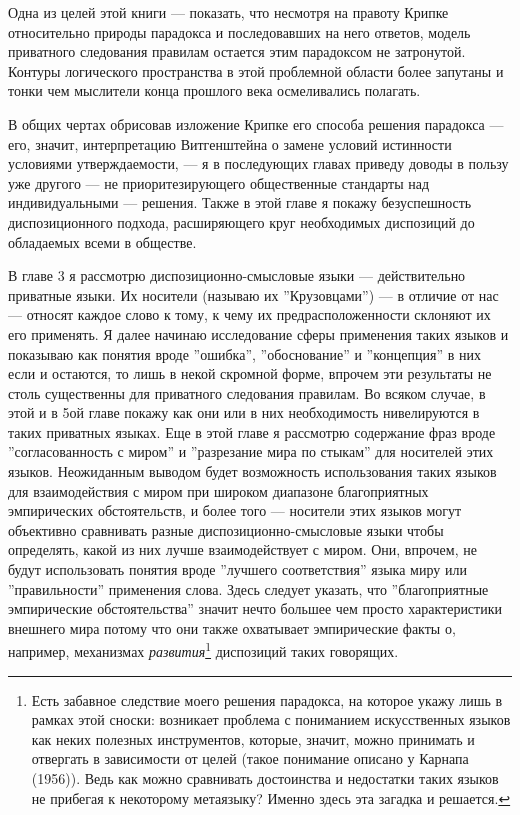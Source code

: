 \documentclass[11pt]{book}
\begin{document}
\smallskip

Одна из целей этой книги --- показать, что несмотря на правоту Крипке относительно природы парадокса и последовавших на него ответов, модель приватного следования правилам остается этим парадоксом не затронутой. Контуры логического пространства в этой проблемной области более запутаны и тонки чем мыслители конца прошлого века осмеливались полагать.

В общих чертах обрисовав изложение Крипке его способа решения парадокса --- его, значит, интерпретацию Витгенштейна о замене условий истинности условиями утверждаемости, --- я в последующих главах приведу доводы в пользу уже другого --- не приоритезирующего общественные стандарты над индивидуальными --- решения. Также в этой главе я покажу безуспешность диспозиционного подхода, расширяющего круг необходимых диспозиций до обладаемых всеми в обществе.

В главе 3 я рассмотрю диспозиционно-смысловые языки --- действительно приватные языки. Их носители (называю их ''Крузовцами'') --- в отличие от нас --- относят каждое слово к тому, к чему их предрасположенности склоняют их его применять. Я далее начинаю исследование сферы применения таких языков и показываю как понятия вроде ''ошибка'', ''обоснование'' и ''концепция'' в них если и остаются, то лишь в некой скромной форме, впрочем эти результаты не столь существенны для приватного следования правилам. Во всяком случае, в этой и в 5ой главе покажу как они или в них необходимость нивелируются в таких приватных языках. Еще в этой главе я рассмотрю содержание фраз вроде ''согласованность с миром'' и ''разрезание мира по стыкам'' для носителей этих языков. Неожиданным выводом будет возможность использования таких языков для взаимодействия с миром при широком диапазоне благоприятных эмпирических обстоятельств, и более того --- носители этих языков могут объективно сравнивать разные диспозиционно-смысловые языки чтобы определять, какой из них лучше взаимодействует с миром. Они, впрочем, не будут использовать понятия вроде ''лучшего соответствия'' языка миру или ''правильности'' применения слова. Здесь следует указать, что ''благоприятные эмпирические обстоятельства'' значит нечто большее чем просто характеристики внешнего мира потому что они также охватывает эмпирические факты о, например, механизмах \textit{развития}\footnote{Есть забавное следствие моего решения парадокса, на которое укажу лишь в рамках этой сноски: возникает проблема с пониманием искусственных языков как неких полезных инструментов, которые, значит, можно принимать и отвергать в зависимости от целей (такое понимание описано у Карнапа (1956)). Ведь как можно сравнивать достоинства и недостатки таких языков не прибегая к некоторому метаязыку? Именно здесь эта загадка и решается.} диспозиций таких говорящих.
\end{document}

